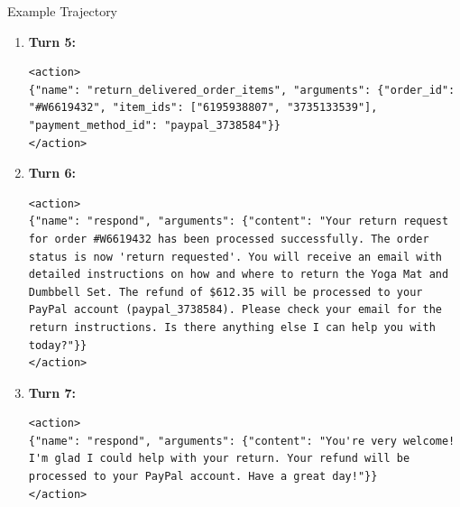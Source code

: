 \begin{prompt}{Example Trajectory}
\begin{enumerate}
        \item \textbf{Turn 5:}
        \begin{lstlisting}
<action>
{"name": "return_delivered_order_items", "arguments": {"order_id": "#W6619432", "item_ids": ["6195938807", "3735133539"], "payment_method_id": "paypal_3738584"}}
</action>
        \end{lstlisting}

        \item \textbf{Turn 6:}
        \begin{lstlisting}
<action>
{"name": "respond", "arguments": {"content": "Your return request for order #W6619432 has been processed successfully. The order status is now 'return requested'. You will receive an email with detailed instructions on how and where to return the Yoga Mat and Dumbbell Set. The refund of $612.35 will be processed to your PayPal account (paypal_3738584). Please check your email for the return instructions. Is there anything else I can help you with today?"}}
</action>
        \end{lstlisting}

        \item \textbf{Turn 7:}
        \begin{lstlisting}
<action>
{"name": "respond", "arguments": {"content": "You're very welcome! I'm glad I could help with your return. Your refund will be processed to your PayPal account. Have a great day!"}}
</action>
        \end{lstlisting}

    \end{enumerate}
\end{prompt}


